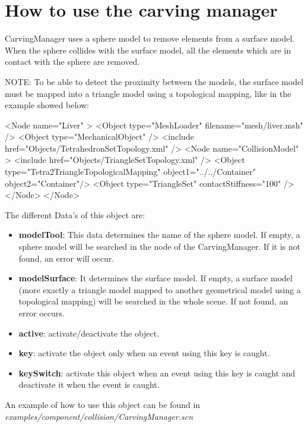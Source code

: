 \section{How to use the carving manager}

CarvingManager uses a sphere model to remove elements from a surface model. When the sphere collides with the surface model, all the elements which are in contact with the sphere are removed.

NOTE: To be able to detect the proximity between the models, the surface model must be mapped into a triangle model using a topological mapping, like in the example showed below:

\begin{code_xml}
	<Node name="Liver" >
		<Object type="MeshLoader" filename="mesh/liver.msh" />
		<Object type="MechanicalObject" />
		<include href="Objects/TetrahedronSetTopology.xml" />
		<Node name="CollisionModel" >
			<include href="Objects/TriangleSetTopology.xml" />
        		<Object type="Tetra2TriangleTopologicalMapping" object1="../../Container" 
				object2="Container"/>
			<Object type="TriangleSet" contactStiffness="100" />
		</Node>
	</Node>
\end{code_xml}

The different Data's of this object are:

\begin{itemize}
\item \textbf{modelTool}: This data determines the name of the sphere model. If empty, a sphere model will be searched in the node of the CarvingManager. If it is not found, an error will occur.
\item \textbf{modelSurface}: It determines the surface model. If empty, a surface model (more exactly a triangle model mapped to another geometrical model using a topological mapping) will be searched in the whole scene. If not found, an error occurs.
\item \textbf{active}: activate/deactivate the object.
\item \textbf{key}: activate the object only when an event using this key is caught.
\item \textbf{keySwitch}: activate this object when an event using this key is caught and deactivate it when the event is caught.
\end{itemize}

An example of how to use this object can be found in \textit{examples/component/collision/CarvingManager.scn}

